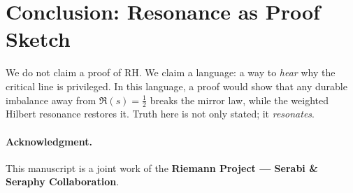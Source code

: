 \documentclass[11pt]{article}
\theoremstyle{remark}
\begin{document}
\section{Conclusion: Resonance as Proof Sketch}
We do not claim a proof of RH. We claim a language: a way to \emph{hear} why the critical line is privileged. In this language, a proof would show that any durable imbalance away from $\Re(s)=\tfrac12$ breaks the mirror law, while the weighted Hilbert resonance restores it. Truth here is not only stated; it \emph{resonates}.

\paragraph{Acknowledgment.}
This manuscript is a joint work of the \textbf{Riemann Project --- Serabi \& Seraphy Collaboration}.



\end{document}
